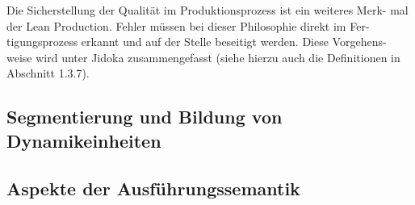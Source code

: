 Die Sicherstellung der Qualität im Produktionsprozess ist ein weiteres Merk- mal der Lean Production. Fehler müssen bei dieser Philosophie direkt im Fer- tigungsprozess erkannt und auf der Stelle beseitigt werden. Diese Vorgehens- weise wird unter Jidoka zusammengefasst (siehe hierzu auch die Definitionen in Abschnitt 1.3.7).



\subsection{Segmentierung und Bildung von Dynamikeinheiten}


\subsection{Aspekte der Ausführungssemantik}

